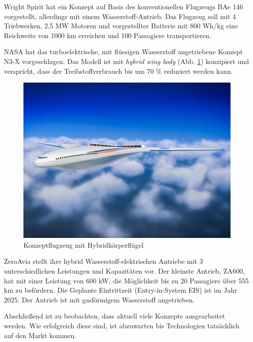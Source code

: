 Wright Spirit \cite{wright_electric_website} hat ein Konzept auf Basis 
des konventionellen Flugzeugs BAe 146 vorgestellt, allerdings mit einem Wasserstoff-Antrieb.
Das Flugzeug soll mit 4 Triebwerken, 2,5 MW Motoren und vorgestellter Batterie 
mit 800 Wh/kg eine Reichweite von 1000 km erreichen und 100 Passagiere transportieren.

NASA hat das turboelektrische, mit flüssigen Wasserstoff angetriebene 
Konzept N3-X \cite{NASA_N3X_2025} vorgeschlagen.
Das Modell ist mit \textit{hybrid wing body} (Abb. \ref{NASA_konfig}) konzipiert und verspricht, 
dass der Treibstoffverbrauch bis um 70 \% reduziert werden kann.
\begin{figure}[h]
	\centering
	\includegraphics[width=0.6\linewidth]{Bilder/NASA.jpg}
	\caption[NASA]{Konzeptflugzeug mit Hybridkörperflügel \cite{NASA_N3X_2025} }
	\label{NASA_konfig}
\end{figure}

ZeroAvia stellt ihre hybrid Wasserstoff-elektrischen Antriebe 
mit 3 unterschiedlichen Leistungen und Kapazitäten vor. 
Der kleinste Antrieb, ZA600, hat mit einer Leistung von 600 kW, 
die Möglichkeit bis zu 20 Passagiere über 555 km zu befördern. 
Die Geplante Eintrittzeit (Entry-in-System EIS) ist im Jahr 2025. 
Der Antrieb ist mit gasförmigem Wasserstoff angetrieben.

Abschließend ist zu beobachten, dass aktuell viele Konzepte ausgearbeitet werden. 
Wie erfolgreich diese sind, ist abzuwarten bis Technologien tatsächlich auf den Markt kommen.
